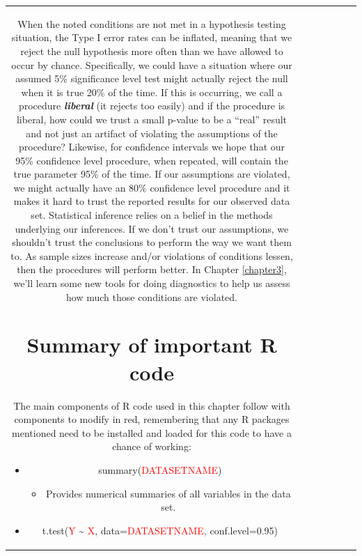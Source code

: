 \documentclass[]{book}
\newenvironment{Shaded}{\begin{snugshade}}{\end{snugshade}}
\providecommand{\tightlist}{%
  \setlength{\itemsep}{0pt}\setlength{\parskip}{0pt}}
\theoremstyle{definition}
\theoremstyle{definition}
\theoremstyle{remark}
\begin{document}
\begin{longtable}[]{@{}ccccccc@{}}
\begin{minipage}[b]{0.10\columnwidth}
\begin{Shaded}
\begin{Highlighting}[]
\begin{Shaded}
\begin{Highlighting}[]
\begin{Shaded}
\begin{Highlighting}[]
\begin{Shaded}
\begin{Highlighting}[]
\begin{Shaded}
\begin{Highlighting}[]
\begin{Shaded}
\begin{Highlighting}[]
\begin{Shaded}
\begin{Highlighting}[]
When the noted conditions are not met in a hypothesis testing situation,
the Type I error rates can be inflated, meaning that we reject the null
hypothesis more often than we have allowed to occur by chance.
Specifically, we could have a situation where our assumed 5\%
significance level test might actually reject the null when it is true
20\% of the time. If this is occurring, we call a procedure
\textbf{\emph{liberal}} (it rejects too easily) and if the procedure is
liberal, how could we trust a small p-value to be a ``real'' result and
not just an artifact of violating the assumptions of the procedure?
Likewise, for confidence intervals we hope that our 95\% confidence
level procedure, when repeated, will contain the true parameter 95\% of
the time. If our assumptions are violated, we might actually have an
80\% confidence level procedure and it makes it hard to trust the
reported results for our observed data set. Statistical inference relies
on a belief in the methods underlying our inferences. If we don't trust
our assumptions, we shouldn't trust the conclusions to perform the way
we want them to. As sample sizes increase and/or violations of
conditions lessen, then the procedures will perform better. In Chapter
\ref{chapter3}, we'll learn some new tools for doing diagnostics to help
us assess how much those conditions are violated.

\section{Summary of important R code}\label{section2-11}

The main components of R code used in this chapter follow with
components to modify in red, remembering that any R packages mentioned
need to be installed and loaded for this code to have a chance of
working:

\begin{itemize}
\item
  summary(\textcolor{red}{DATASETNAME})

  \begin{itemize}
  \tightlist
  \item
    Provides numerical summaries of all variables in the data set.
  \end{itemize}
\item
  t.test(\textcolor{red}{Y} \textasciitilde{} \textcolor{red}{X},
  data=\textcolor{red}{DATASETNAME}, conf.level=0.95)


\end{itemize}
\end{Highlighting}
\end{Shaded}
\end{Highlighting}
\end{Shaded}
\end{Highlighting}
\end{Shaded}
\end{Highlighting}
\end{Shaded}
\end{Highlighting}
\end{Shaded}
\end{Highlighting}
\end{Shaded}
\end{Highlighting}
\end{Shaded}
\end{minipage}
\end{longtable}
\end{document}
